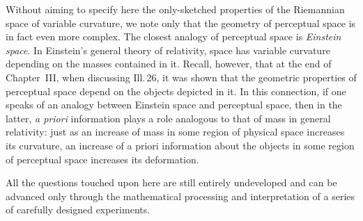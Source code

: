Without aiming to specify here the only-sketched properties of the Riemannian space of
variable curvature, we note only that the geometry of perceptual space is in fact even more
complex.  The closest analogy of perceptual space is \emph{Einstein space}.  In Einstein's
general theory of relativity, space has variable curvature depending on the masses
contained in it.  Recall, however, that at the end of Chapter~III, when discussing
Ill.\,26, it was shown that the geometric properties of perceptual space depend on the
objects depicted in it.  In this connection, if one speaks of an analogy between Einstein
space and perceptual space, then in the latter, \emph{a priori} information plays a role
analogous to that of mass in general relativity: just as an increase of mass in some region
of physical space increases its curvature, an increase of a priori information about the
objects in some region of perceptual space increases its deformation.


All the questions touched upon here are still entirely undeveloped and can be advanced only
through the mathematical processing and interpretation of a series of carefully designed
experiments.
